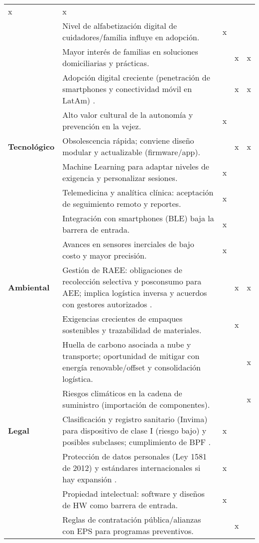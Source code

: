 \begin{longtable}{p{2.6cm} p{8.6cm} c c c}
x & x &   \\
& Nivel de alfabetización digital de cuidadores/familia influye en adopción. &
x &   &   \\
& Mayor interés de familias en soluciones domiciliarias y prácticas. &
  & x & x \\
& Adopción digital creciente (penetración de smartphones y conectividad móvil en LatAm) \cite{GSMA2024MobileLatAm}. &
  & x & x \\
& Alto valor cultural de la autonomía y prevención en la vejez. &
x &   &   \\
\midrule
\textbf{Tecnológico} &
Obsolescencia rápida; conviene diseño modular y actualizable (firmware/app). &
  & x & x \\
& Machine Learning para adaptar niveles de exigencia y personalizar sesiones. &
x &   &   \\
& Telemedicina y analítica clínica: aceptación de seguimiento remoto y reportes. &
x &   &   \\
& Integración con smartphones (BLE) baja la barrera de entrada. &
x &   &   \\
& Avances en sensores inerciales de bajo costo y mayor precisión. &
x &   &   \\
\midrule
\textbf{Ambiental} &
Gestión de RAEE: obligaciones de recolección selectiva y posconsumo para AEE; implica logística inversa y acuerdos con gestores autorizados \cite{Ley1672RAEE,Resolucion1512RAEE}. &
  & x & x \\
& Exigencias crecientes de empaques sostenibles y trazabilidad de materiales. &
  & x &   \\
& Huella de carbono asociada a nube y transporte; oportunidad de mitigar con energía renovable/offset y consolidación logística. &
  &   & x \\
& Riesgos climáticos en la cadena de suministro (importación de componentes). &
  &   & x \\
\midrule
\textbf{Legal} &
Clasificación y registro sanitario (Invima) para dispositivo de clase I (riesgo bajo) y posibles subclases; cumplimiento de BPF \cite{InvimaDispositivos,Decreto4725}. &
x &   &   \\
& Protección de datos personales (Ley 1581 de 2012) y estándares internacionales si hay expansión \cite{Ley1581Datos}. &
x &   &   \\
& Propiedad intelectual: software y diseños de HW como barrera de entrada. &
x &   &   \\
& Reglas de contratación pública/alianzas con EPS para programas preventivos. &
  & x &   \\
\end{longtable}

